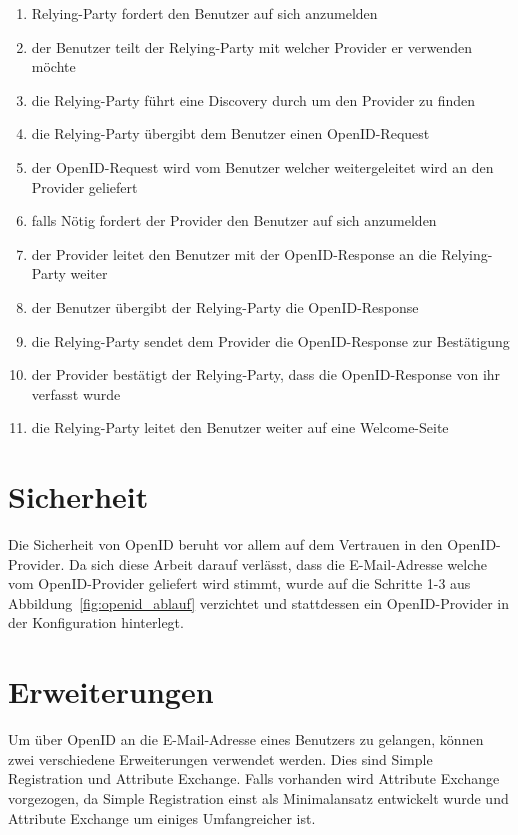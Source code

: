 \begin{enumerate}
  \item Relying-Party fordert den Benutzer auf sich anzumelden
  \item der Benutzer teilt der Relying-Party mit welcher Provider er verwenden möchte
  \item die Relying-Party führt eine Discovery durch um den Provider zu finden
  \item die Relying-Party übergibt dem Benutzer einen OpenID-Request
  \item der OpenID-Request wird vom Benutzer welcher weitergeleitet wird an den Provider geliefert
  \item falls Nötig fordert der Provider den Benutzer auf sich anzumelden
  \item der Provider leitet den Benutzer mit der OpenID-Response an die Relying-Party weiter
  \item der Benutzer übergibt der Relying-Party die OpenID-Response
  \item die Relying-Party sendet dem Provider die OpenID-Response zur Bestätigung
  \item der Provider bestätigt der Relying-Party, dass die OpenID-Response von ihr verfasst wurde
  \item die Relying-Party leitet den Benutzer weiter auf eine Welcome-Seite
\end{enumerate}

\section{Sicherheit}
\label{sec:sicherheit}
Die Sicherheit von OpenID beruht vor allem auf dem Vertrauen in den OpenID-Provider. Da sich diese Arbeit darauf verlässt, dass die E-Mail-Adresse welche vom OpenID-Provider geliefert wird stimmt, wurde auf die Schritte 1-3 aus Abbildung~\ref{fig:openid_ablauf} verzichtet und stattdessen ein OpenID-Provider in der Konfiguration hinterlegt.

\section{Erweiterungen}
\label{sec:erweiterungen}
Um über OpenID an die E-Mail-Adresse eines Benutzers zu gelangen, können zwei verschiedene Erweiterungen verwendet werden. Dies sind Simple Registration\cite{openid/sreg1.0} und Attribute Exchange\cite{openid/ax1.0}. Falls vorhanden wird Attribute Exchange vorgezogen, da Simple Registration einst als Minimalansatz entwickelt wurde und Attribute Exchange um einiges Umfangreicher ist. 